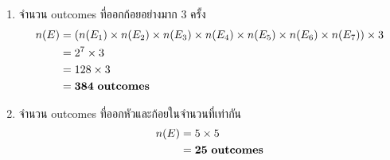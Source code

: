 \documentclass{article}
\begin{document}
\begin{enumerate}
\begin{enumerate}
		\item จำนวน outcomes ที่ออกก้อยอย่างมาก 3 ครั้ง
		\begin{equation}
		\begin{split}
		n(E) &= (n(E_1) \times n(E_2) \times n(E_3) \times n(E_4) \times n(E_5) \times n(E_6) \times n(E_7)) \times 3 \notag \\
		&= 2^7 \times 3 \\
		&= 128 \times 3 \\
		&=  \mathbf{384~outcomes}
		\end{split}
		\end{equation}
		
		\item จำนวน outcomes ที่ออกหัวและก้อยในจำนวนที่เท่ากัน
		\begin{equation}
		\begin{split}
		n(E) &= 5 \times 5 \notag \\
		&=  \mathbf{25~outcomes}
		\end{split}
		\end{equation}
	\end{enumerate}
\end{enumerate}
\end{document}
